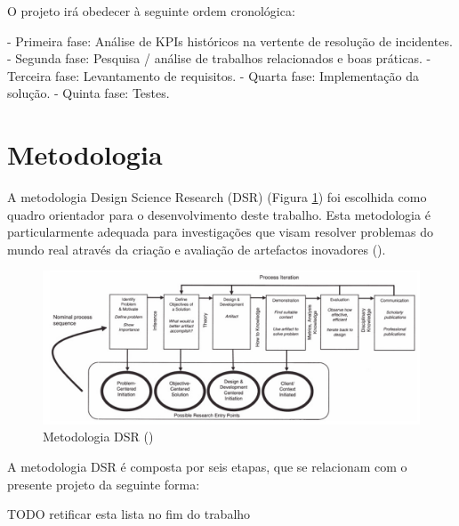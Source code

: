  O projeto irá obedecer à seguinte ordem cronológica:

 - Primeira fase: Análise de KPIs históricos na vertente de resolução de incidentes.
 - Segunda fase: Pesquisa / análise de trabalhos relacionados e boas práticas.
 - Terceira fase: Levantamento de requisitos.
 - Quarta fase: Implementação da solução.
 - Quinta fase: Testes.

\section{Metodologia}


A metodologia Design Science Research (DSR) (Figura \ref{fig:dsr}) foi escolhida como quadro orientador para o desenvolvimento deste trabalho. Esta metodologia é particularmente adequada para investigações que visam resolver problemas do mundo real através da criação e avaliação de artefactos inovadores (\cite{peffers2007design}).

\begin{figure}[H]
\centering
\includegraphics[width=1\linewidth]{ch1/dsr.png}
\caption{Metodologia DSR (\cite{peffers2007design})}
\label{fig:dsr}
\end{figure}

A metodologia DSR é composta por seis etapas, que se relacionam com o presente projeto da seguinte forma:

TODO retificar esta lista no fim do trabalho

